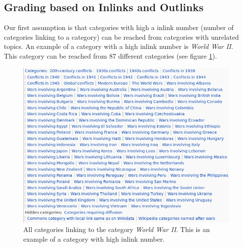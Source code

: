 \subsection{Grading based on Inlinks and Outlinks} %
\label{sec:grading_based_on_inlinks_and_outlinks}
Our first assumption is that categories with high a inlink number (number of categories linking to a category) can be reached from categories with unrelated topics. An example of a category with a high inlink number is  \emph{World War II}. This category can be reached from 87 different categories (see figure \ref{fig:high_inlink_number}). 


\begin{figure}[h]
\centering
\includegraphics[width=\textwidth]{Chapters/Implementation/Grading/high_inlink_number}
\caption[Example of category with high \emph{inlink number}]{All categories linking to the category \emph{World War II}. This is an example of a category with high inlink number.}
\label{fig:high_inlink_number}
\end{figure}

